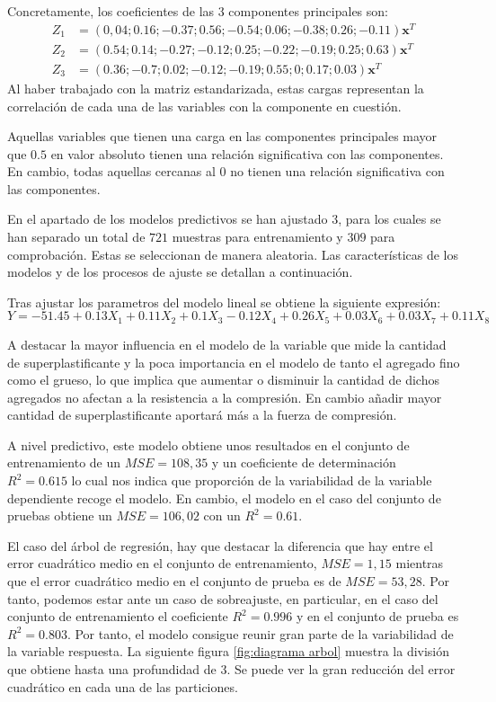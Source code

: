 \noindent Concretamente, los coeficientes de las 3 componentes principales son:
\begin{align}
Z_1&=(0,04;0.16;-0.37  ; 0.56  ;   -0.54  ;  0.06 ;  -0.38  ; 0.26  ; -0.11)\mathbf{x}^T\\
Z_2&=(0.54 ; 0.14 ;  -0.27  ; -0.12 ;   0.25  ; -0.22 ;  -0.19 ;  0.25  ;  0.63)\mathbf{x}^T\\
Z_3&=(0.36 ; -0.7 ;  0.02 ;-0.12; -0.19  ; 0.55 ; 0 ;   0.17 ; 0.03)\mathbf{x}^T
\end{align}
\noindent Al haber trabajado con la matriz estandarizada, estas cargas representan la correlación de cada una de las variables con la componente en cuestión. 

\noindent Aquellas variables que tienen una carga en las componentes principales mayor que $0.5$ en valor absoluto tienen una relación significativa con las componentes. En cambio, todas aquellas cercanas al $0$ no tienen una relación significativa con las componentes. 

\noindent En el apartado de los modelos predictivos se han ajustado 3, para los cuales se han separado un total de $721$ muestras para entrenamiento y $309$ para comprobación. Estas se seleccionan de manera aleatoria.
\noindent Las características de los modelos y de los procesos de ajuste se detallan a continuación. 

\noindent Tras ajustar los parametros del modelo lineal se obtiene la siguiente expresión:
{\footnotesize
 \begin{equation}
Y=-51.45+0.13 X_1+0.11X_2+0.1X_3-0.12X_4+0.26X_5+  0.03X_6+0.03X_7+0.11X_8
\end{equation}}

\noindent A destacar la mayor influencia en el modelo de la variable que mide la cantidad de superplastificante y la poca importancia en el modelo de tanto el agregado fino como el grueso, lo que implica que aumentar o disminuir la cantidad de dichos agregados no afectan a la resistencia a la compresión. En cambio añadir mayor cantidad de superplastificante aportará más a la fuerza de compresión.
  
\noindent A nivel predictivo, este modelo obtiene unos resultados en el conjunto de entrenamiento de un $MSE=108,35$ y un coeficiente de determinación $R^2=0.615$ lo cual nos indica que proporción de la variabilidad de la variable dependiente recoge el modelo. En cambio, el modelo en el caso del conjunto de pruebas obtiene un $MSE=106,02$ con un $R^2=0.61$. 

\noindent El caso del árbol de regresión, hay que destacar la diferencia que hay entre el error cuadrático medio en el conjunto de entrenamiento, $MSE=1,15$ mientras que el error cuadrático medio en el conjunto de prueba es de $MSE=53,28$. Por tanto, podemos estar ante un caso de sobreajuste, en particular, en el caso del conjunto de entrenamiento el coeficiente $R^2=0.996$ y en el conjunto de prueba es $R^2=0.803$.  Por tanto, el modelo consigue reunir gran parte de la variabilidad de la variable respuesta. La siguiente figura \ref{fig:diagrama arbol} muestra la división que obtiene hasta una profundidad de 3. Se puede ver la gran reducción del error cuadrático en cada una de las particiones.

